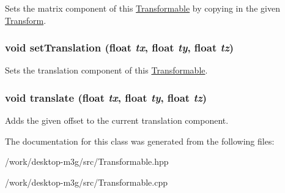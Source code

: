 Sets the matrix component of this \hyperlink{classm3g_1_1Transformable}{Transformable} by copying in the given \hyperlink{classm3g_1_1Transform}{Transform}. \hypertarget{classm3g_1_1Transformable_afd728a7db85b8e12bdafc2b3c08a515}{
\subsubsection[{setTranslation}]{\setlength{\rightskip}{0pt plus 5cm}void setTranslation (float {\em tx}, \/  float {\em ty}, \/  float {\em tz})}}
\label{classm3g_1_1Transformable_afd728a7db85b8e12bdafc2b3c08a515}


Sets the translation component of this \hyperlink{classm3g_1_1Transformable}{Transformable}. \hypertarget{classm3g_1_1Transformable_66d493b8307a85e615c4eb89116f2e09}{
\subsubsection[{translate}]{\setlength{\rightskip}{0pt plus 5cm}void translate (float {\em tx}, \/  float {\em ty}, \/  float {\em tz})}}
\label{classm3g_1_1Transformable_66d493b8307a85e615c4eb89116f2e09}


Adds the given offset to the current translation component. 

The documentation for this class was generated from the following files:\begin{CompactItemize}
\item 
/work/desktop-m3g/src/Transformable.hpp\item 
/work/desktop-m3g/src/Transformable.cpp\end{CompactItemize}
